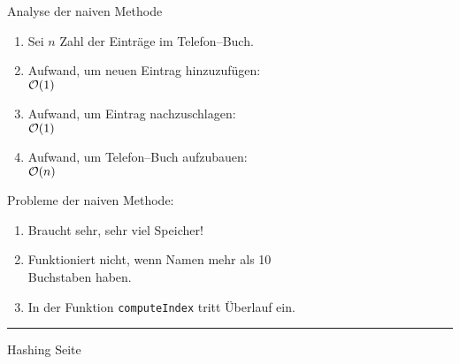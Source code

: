
\begin{slide}{}
\normalsize

\begin{center}
Analyse der naiven Methode
\end{center}
\vspace*{0.5cm}

\footnotesize
\begin{enumerate}
\item Sei $n$ Zahl der Eintr\"age im Telefon--Buch.
\item Aufwand, um neuen Eintrag hinzuzuf\"ugen: \\[0.3cm]
      \hspace*{1.3cm} $\mathcal{O}(1)$
\item Aufwand, um Eintrag nachzuschlagen: \\[0.3cm]
      \hspace*{1.3cm} $\mathcal{O}(1)$
\item Aufwand, um Telefon--Buch aufzubauen:  \\[0.3cm]
      \hspace*{1.3cm} $\mathcal{O}(n)$
\end{enumerate}
\vspace*{0.3cm}

\begin{center}
\end{center}

\vspace*{0.3cm}
Probleme der naiven Methode:
\begin{enumerate}
\item Braucht sehr, sehr viel Speicher!
\item Funktioniert nicht, wenn Namen mehr als 10 \\
      Buchstaben haben.
\item In der Funktion \texttt{computeIndex} tritt Überlauf ein.
\end{enumerate}


\vspace*{\fill}
\tiny \addtocounter{mypage}{1}
\rule{17cm}{1mm}
Hashing  \hspace*{\fill} Seite 
\end{slide}


